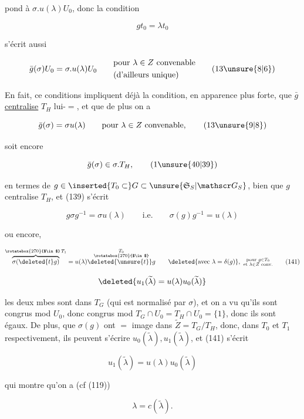 

pond à $\sigma.u(\lambda)U_0$, donc la condition

\[gt_0=\lambda t_0\]

s'écrit aussi

\[\bar g(\sigma)U_0=\sigma.u(\lambda)U_0\qquad\begin{aligned}&\text{pour }\lambda\in Z\text{ convenable}\\&\text{(d'ailleurs unique)}\end{aligned}\tag*{(13\unsure{8|6})}\]

En fait, ce conditions impliquent déjà la condition, en apparence plus forte, que $\bar g$  \uline{centralise} $T_H$ lui-$=$, et que de plus on a

\[\bar g(\sigma)=\sigma u(\lambda)\qquad\text{pour }\lambda\in Z\text{ convenable},\tag*{(13\unsure{9|8})}\]

soit encore

\[\bar g(\sigma)\in\sigma.T_H,\tag*{(1\unsure{40|39})}\]

  en termes de $g\in\inserted{T_0\subset}G\subset\unsure{\mathfrak S_S|\mathscr G_S}$,   bien que $g$ centralise $T_H$, et (139) s'écrit 

\[g\sigma g^{-1}=\sigma u(\lambda)\qquad\text{i.e.}\qquad\sigma(g)g^{-1}=u(\lambda)\]

ou encore, 

\[\overbrace{\sigma(\deleted{t}g)}^{\rotatebox{270}{$\in$}\, T_1}=u(\lambda)\overset{\substack{T_0\\\rotatebox{270}{$\in$}}}{\deleted{\unsure{t}}g}\qquad \deleted{\text{avec }\lambda=\delta(g)},\ \substack{\text{pour }g\in T_0\\\text{et }\lambda\in Z\text{ conv.}}\tag*{(141)}\]


\[\deleted{u_1(\widetilde\lambda)=u(\lambda)u_0(\widetilde\lambda)}\]

  les deux mbes sont dans $T_G$ (qui est normalisé par $\sigma$), et on a vu qu'ils sont congrus mod $U_0$, donc congrus mod $T_G\cap U_0=T_H\cap U_0=\{1\}$, donc ils sont égaux. De plus,   que  $\sigma(g)$  ont $=$ image \inserted{$\widetilde\lambda$} dans $\widetilde Z=T_G/T_H$, donc,   dans $T_0$ et $T_1$ respectivement, ils peuvent s'écrire $u_0(\widetilde\lambda),u_1(\widetilde\lambda)$, et (141) s'écrit

\[u_1(\widetilde\lambda)=u(\lambda)u_0(\widetilde\lambda)\tag*{(142)}\]

qui montre qu'on a (cf (119))

\[\lambda=c(\widetilde\lambda).\tag*{(143)}\]

